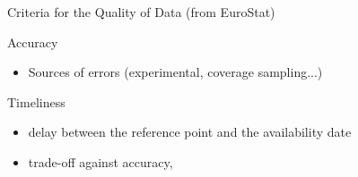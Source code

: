 \documentclass[xcolor=x11names,compress,8pt,
handout
]{beamer}
\renewcommand{\(}{\begin{columns}}
\renewcommand{\)}{\end{columns}}
\newcommand{\<}[1]{\begin{column}{#1}}
\renewcommand{\>}{\end{column}}
\begin{document}
\begin{frame}{Criteria for the Quality of Data (from EuroStat)}
\begin{alertblock}{Accuracy}
\begin{itemize}
\item Sources of errors (experimental, coverage sampling...)
\end{itemize}
\end{alertblock}
\pause
\begin{alertblock}{Timeliness}
\begin{itemize}
\item delay between the reference point and the availability date
\item trade-off against accuracy, 
\end{itemize}
\end{alertblock}
%

\end{frame}
\end{document}
